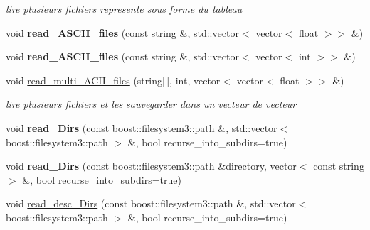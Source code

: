 \begin{DoxyCompactItemize}
\begin{DoxyCompactList}\small\item\em lire plusieurs fichiers represente sous forme du tableau \end{DoxyCompactList}\item 
\hypertarget{class_fichiers_ad27c55a0d14da67e9053a358babf5606}{
void {\bfseries read\_\-ASCII\_\-files} (const string \&, std::vector$<$ vector$<$ float $>$$>$ \&)}
\label{class_fichiers_ad27c55a0d14da67e9053a358babf5606}

\item 
\hypertarget{class_fichiers_ac550b518ae381d04814924fb2b0ef169}{
void {\bfseries read\_\-ASCII\_\-files} (const string \&, std::vector$<$ vector$<$ int $>$$>$ \&)}
\label{class_fichiers_ac550b518ae381d04814924fb2b0ef169}

\item 
\hypertarget{class_fichiers_a3ea9421fe86c962fdcdc3a64c89ee6af}{
void \hyperlink{class_fichiers_a3ea9421fe86c962fdcdc3a64c89ee6af}{read\_\-multi\_\-ACII\_\-files} (string\mbox{[}$\,$\mbox{]}, int, vector$<$ vector$<$ float $>$$>$ \&)}
\label{class_fichiers_a3ea9421fe86c962fdcdc3a64c89ee6af}

\begin{DoxyCompactList}\small\item\em lire plusieurs fichiers et les sauvegarder dans un vecteur de vecteur \end{DoxyCompactList}\item 
\hypertarget{class_fichiers_a0c3f76d0484467e2db9e0b5d685fd851}{
void {\bfseries read\_\-Dirs} (const boost::filesystem3::path \&, std::vector$<$ boost::filesystem3::path $>$ \&, bool recurse\_\-into\_\-subdirs=true)}
\label{class_fichiers_a0c3f76d0484467e2db9e0b5d685fd851}

\item 
\hypertarget{class_fichiers_a58ede5ad6bc1f8de937fcbabcbab2e4f}{
void {\bfseries read\_\-Dirs} (const boost::filesystem3::path \&directory, vector$<$ const string $>$ \&, bool recurse\_\-into\_\-subdirs=true)}
\label{class_fichiers_a58ede5ad6bc1f8de937fcbabcbab2e4f}

\item 
\hypertarget{class_fichiers_a02ac27c87b35a3f3252eeca1f134ab04}{
void \hyperlink{class_fichiers_a02ac27c87b35a3f3252eeca1f134ab04}{read\_\-desc\_\-Dirs} (const boost::filesystem3::path \&, std::vector$<$ boost::filesystem3::path $>$ \&, bool recurse\_\-into\_\-subdirs=true)}
\label{class_fichiers_a02ac27c87b35a3f3252eeca1f134ab04}


\end{DoxyCompactItemize}
